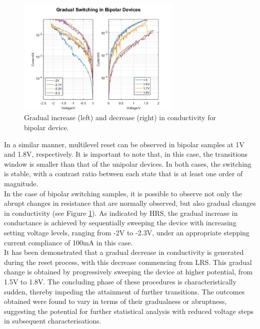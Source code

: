 \begin{figure}[htbp!] 
    \centering    
    \includegraphics[width=0.7\textwidth]{Chapter3/Figs/q.png}
    \caption[Gradual increase (left) and decrease (right) in conductivity for bipolar device.]{Gradual increase (left) and decrease (right) in conductivity for bipolar device.}
    \label{fig:3q}
\end{figure}

\noindent In a similar manner, multilevel reset can be observed in bipolar samples at 1V and 1.8V, respectively. It is important to note that, in this case, the transitions window is smaller than that of the unipolar devices. In both cases, the switching is stable, with a contrast ratio between each state that is at least one order of magnitude.\\

\noindent In the case of bipolar switching samples, it is possible to observe not only the abrupt changes in resistance that are normally observed, but also gradual changes in conductivity (see Figure \ref{fig:3q}). As indicated by HRS, the gradual increase in conductance is achieved by sequentially sweeping the device with increasing setting voltage levels, ranging from -2V to -2.3V, under an appropriate stepping current compliance of 100mA in this case.\\

\noindent It has been demonstrated that a gradual decrease in conductivity is generated during the reset process, with this decrease commencing from LRS. This gradual change is obtained by progressively sweeping the device at higher potential, from 1.5V to 1.8V. The concluding phase of these procedures is characteristically sudden, thereby impeding the attainment of further transitions. The outcomes obtained were found to vary in terms of their gradualness or abruptness, suggesting the potential for further statistical analysis with reduced voltage steps in subsequent characterisations.\\

